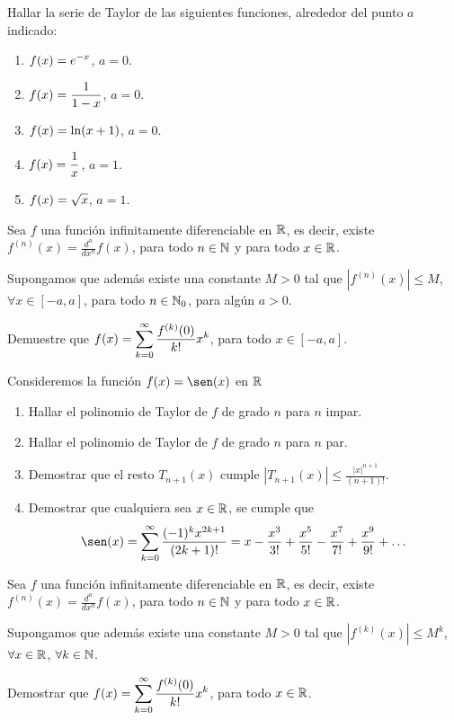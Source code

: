 \item Hallar la serie de Taylor de las siguientes funciones, alrededor del punto $a$ indicado:
\begin{multicols}{2}
  \begin{enumerate}
    \item $\displaystyle f(x) = e^{-x}$, $a = 0$.
    \item $\displaystyle f(x) = \frac1{1-x}$, $a = 0$.
    \item $\displaystyle f(x) = \ln (x+1)$, $a = 0$.
    \item $\displaystyle f(x) = \frac1x$, $a = 1$.
    \item $\displaystyle f(x) = \sqrt{x}$, $a = 1$.
  \end{enumerate}
  
\end{multicols}

\item Sea $f$ una función infinitamente diferenciable en $\mathbb{R}$, es decir, existe $f^{(n)}(x) = \frac{d^n}{dx^n}f(x)$, para todo $n\in 
\mathbb{N}$ y para todo $x\in \mathbb{R}$. 

Supongamos que además existe una constante $M>0$ tal que $|f^{(n)}(x)| \le M$, $\forall x\in [-a,a]$, para todo $n\in\mathbb{N}_0$, para algún $a>0$.

Demuestre que 
$\displaystyle f(x) = \sum_{k=0}^\infty \frac{f^{(k)}(0)}{k!}x^k$, para todo $x\in [-a,a]$.

\item Consideremos la función $f(x)=\sen(x)$ en $\mathbb{R}$

\begin{enumerate}
\item Hallar el polinomio de Taylor de $f$ de grado $n$ para $n$ impar.

\item Hallar el polinomio de Taylor de $f$ de grado $n$ para $n$ par.

\item Demostrar que el resto $T_{n+1}(x)$ cumple $|T_{n+1}(x)| \le \frac{|x|^{n+1}}{(n+1)!}$.

\item  Demostrar que cualquiera sea $x \in \mathbb{R}$, se cumple que
\[ 
\sen(x) = \sum_{k=0}^\infty \frac{(-1)^k x^{2k+1} }{(2k+1)!}  
= x - \frac{x^3}{3!} + \frac{x^5}{5!} - \frac{x^7}{7!} + \frac{x^9}{9!} + \dots
\]
\end{enumerate}

\item Sea $f$ una función infinitamente diferenciable en $\mathbb{R}$, es decir, existe $f^{(n)}(x) = \frac{d^n}{dx^n}f(x)$, para todo $n\in 
\mathbb{N}$ y para todo $x\in \mathbb{R}$. 

Supongamos que además existe una constante $M>0$ tal que $|f^{(k)}(x)| \le M^k$, $\forall x\in \mathbb{R}$, $\forall k \in \mathbb{N}$.

Demostrar que 
$\displaystyle f(x) = \sum_{k=0}^\infty \frac{f^{(k)}(0)}{k!}x^k$, para todo $x\in \mathbb{R}$.